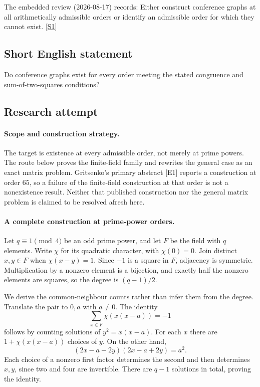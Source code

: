 \documentclass[11pt,a4paper]{article}
\newcommand{\sref}[2]{\hyperlink{source:#1:#2}{[S#2]}}
\begin{document}
The embedded review (2026-08-17) records: Either construct conference graphs at all arithmetically admissible orders or identify an admissible order for which they cannot exist. \sref{statement}{1}

\subsection{Short English statement}

Do conference graphs exist for every order meeting the stated congruence and sum-of-two-squares conditions?

\subsection{Research attempt}

\paragraph{Scope and construction strategy.}
The target is existence at every admissible order, not merely at prime
powers. The route below proves the finite-field family and rewrites the
general case as an exact matrix problem. Gritsenko's primary abstract
[E1] reports a construction at order $65$, so a failure of the
finite-field construction at that order is not a nonexistence result.
Neither that published construction nor the general matrix problem is
claimed to be resolved afresh here.

\paragraph{A complete construction at prime-power orders.}
Let $q\equiv1\pmod4$ be an odd prime power, and let $F$ be the field
with $q$ elements. Write $\chi$ for its quadratic character, with
$\chi(0)=0$. Join distinct $x,y\in F$ when $\chi(x-y)=1$.
Since $-1$ is a square in $F$, adjacency is symmetric. Multiplication
by a nonzero element is a bijection, and exactly half the nonzero
elements are squares, so the degree is $(q-1)/2$.

We derive the common-neighbour counts rather than infer them from the
degree. Translate the pair to $0,a$ with $a\ne0$. The identity
\[
               \sum_{x\in F}\chi(x(x-a))=-1
\]
follows by counting solutions of $y^2=x(x-a)$. For each $x$ there
are $1+\chi(x(x-a))$ choices of $y$. On the other hand,
\[
               (2x-a-2y)(2x-a+2y)=a^2.
\]
Each choice of a nonzero first factor determines the second and then
determines $x,y$, since two and four are invertible. There are $q-1$
solutions in total, proving the identity.
\end{document}
